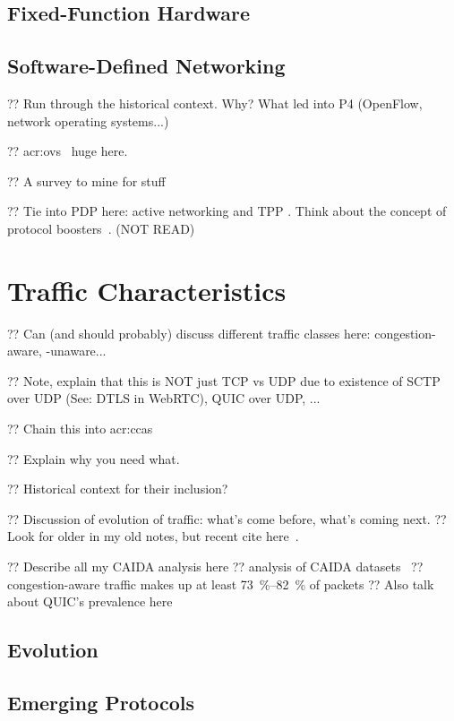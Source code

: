 \subsection{Fixed-Function Hardware}

\subsection{Software-Defined Networking}

?? Run through the historical context. Why? What led into P4 (OpenFlow, network operating systems...)

?? \gls{acr:ovs}~\parencite{DBLP:conf/nsdi/PfaffPKJZRGWSSA15} huge here.

?? A survey to mine for stuff~\parencite{DBLP:journals/comsur/NunesMNOT14}

?? Tie into PDP here: active networking and TPP . Think about the concept of protocol boosters~\parencite{DBLP:journals/jsac/FeldmeierMSBMR98}. (NOT READ)

\section{Traffic Characteristics}

?? Can (and should probably) discuss different traffic classes here: congestion-aware, -unaware...

?? Note, explain that this is NOT just TCP vs UDP due to existence of SCTP over UDP (See: DTLS in WebRTC), QUIC over UDP, ...

?? Chain this into \glspl{acr:cca}

?? Explain why you need what.

?? Historical context for their inclusion?

?? Discussion of evolution of traffic: what's come before, what's coming next.
?? Look for older in my old notes, but recent cite here~\parencite{DBLP:conf/anrw/BauerJHBC21}.

?? Describe all my CAIDA analysis here
?? analysis of CAIDA datasets~\parencite{caida-2018-passive}
?? congestion-aware traffic makes up at least \qtyrange{73}{82}{\percent} of packets
?? Also talk about QUIC's prevalence here

\subsection{Evolution}

\subsection{Emerging Protocols}


